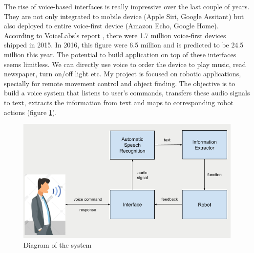 The rise of voice-based interfaces is really impressive over the last couple of years. They are not only integrated to mobile device (Apple Siri, Google Assitant) but also deployed to entire voice-first device (Amazon Echo, Google Home). According to VoiceLabs's report \cite{VoiceLabs:2017}, there were 1.7 million voice-first devices shipped in 2015. In 2016, this figure were 6.5 million and is predicted to be 24.5 million this year. The potential to build application on top of these interfaces seems limitless. We can directly use voice to order the device to play music, read newspaper, turn on/off light etc. My project is focused on robotic applications, specially for remote movement control and object finding. The objective is to build a voice system that listens to user's commands, transfers these audio signals to text, extracts the information from text and maps to corresponding robot actions (figure \ref{fig:diagramSystem}). 
\begin{figure}[tb]
\centering
\includegraphics[width = 0.7\hsize]{./figures/diagramSystem}
\caption{Diagram of the system}
\label{fig:diagramSystem}
\end{figure}


%
%
